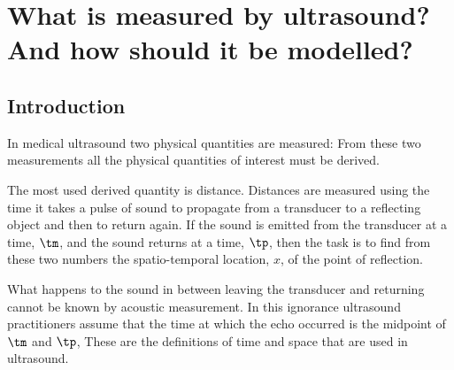 

\chapter{What is measured by ultrasound?\\And how should it be modelled?}\label{ch:observables}



\section{Introduction}\label{sec:measurement}


In medical ultrasound two physical quantities are measured:
From these two measurements all the physical quantities of interest must be derived.

The most used derived quantity is distance.
Distances are measured using the time it takes a pulse of sound to propagate from a transducer
to a reflecting object and then to return again. 
If the sound is emitted from the transducer at a time, $\tm$,
and the sound returns at a time,  $\tp$,
then the task is to find from these two numbers the spatio-temporal location, $x$,
of the point of reflection.

What happens to the sound in between leaving the transducer and returning
cannot be known by acoustic measurement.
In this ignorance ultrasound practitioners assume that the time at which the echo 
occurred is the midpoint of $\tm$ and $\tp$,
These are the definitions of time and space that are used in ultrasound.



